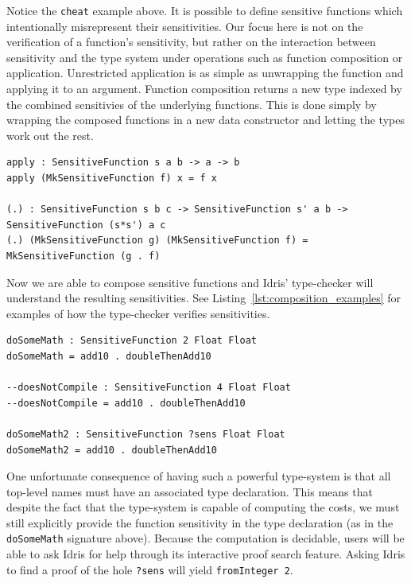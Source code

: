 \documentclass[12pt]{article}
\begin{document}
Notice the \texttt{cheat} example above.
It is possible to define sensitive functions which intentionally misrepresent their sensitivities.
Our focus here is not on the verification of a function's sensitivity, but rather on the interaction between sensitivity and the type system under operations such as function composition or application.
Unrestricted application is as simple as unwrapping the function and applying it to an argument.
Function composition returns a new type indexed by the combined sensitivies of the underlying functions.
This is done simply by wrapping the composed functions in a new data constructor and letting the types work out the rest.

\begin{lstlisting}
apply : SensitiveFunction s a b -> a -> b
apply (MkSensitiveFunction f) x = f x

(.) : SensitiveFunction s b c -> SensitiveFunction s' a b -> SensitiveFunction (s*s') a c
(.) (MkSensitiveFunction g) (MkSensitiveFunction f) = MkSensitiveFunction (g . f)
\end{lstlisting}

Now we are able to compose sensitive functions and Idris' type-checker will understand the resulting sensitivities.
See Listing~\ref{lst:composition_examples} for examples of how the type-checker verifies sensitivities.

\begin{lstlisting}[caption={Examples of Sensitive Function Composition},label={lst:composition_examples}]
doSomeMath : SensitiveFunction 2 Float Float
doSomeMath = add10 . doubleThenAdd10

--doesNotCompile : SensitiveFunction 4 Float Float
--doesNotCompile = add10 . doubleThenAdd10

doSomeMath2 : SensitiveFunction ?sens Float Float
doSomeMath2 = add10 . doubleThenAdd10
\end{lstlisting}

One unfortunate consequence of having such a powerful type-system is that all top-level names must have an associated type declaration.
This means that despite the fact that the type-system is capable of computing the costs, we must still explicitly provide the function sensitivity in the type declaration (as in the \texttt{doSomeMath} signature above).
Because the computation is decidable, users will be able to ask Idris for help through its interactive proof search feature.
Asking Idris to find a proof of the hole \texttt{?sens} will yield \texttt{fromInteger 2}.
\end{document}
